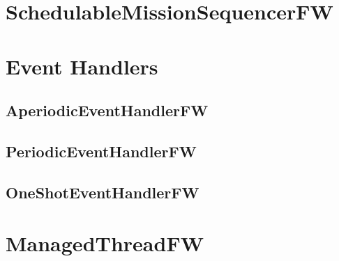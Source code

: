 \documentclass{article}
\begin{document}
\section{SchedulableMissionSequencerFW}

\newpage

\section{Event Handlers}
\subsection{AperiodicEventHandlerFW}

\newpage

\subsection{PeriodicEventHandlerFW}

\newpage

\subsection{OneShotEventHandlerFW}

\newpage

\section{ManagedThreadFW}

\newpage
\end{document}
